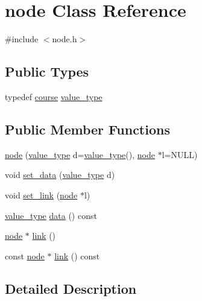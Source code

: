 \hypertarget{classnode}{}\section{node Class Reference}
\label{classnode}


{\ttfamily \#include $<$node.\+h$>$}

\subsection*{Public Types}
\begin{DoxyCompactItemize}
\item 
typedef \hyperlink{classcourse}{course} \hyperlink{classnode_af79958a8234d1a3d642adf6637cb9f9b}{value\+\_\+type}
\end{DoxyCompactItemize}
\subsection*{Public Member Functions}
\begin{DoxyCompactItemize}
\item 
\hyperlink{classnode_a4d89d50fbee6842a2588ef0c07063cb8}{node} (\hyperlink{classnode_af79958a8234d1a3d642adf6637cb9f9b}{value\+\_\+type} d=\hyperlink{classnode_af79958a8234d1a3d642adf6637cb9f9b}{value\+\_\+type}(), \hyperlink{classnode}{node} $\ast$l=N\+U\+LL)
\item 
void \hyperlink{classnode_ac9906af97ebcd35ffa46145f865eed6c}{set\+\_\+data} (\hyperlink{classnode_af79958a8234d1a3d642adf6637cb9f9b}{value\+\_\+type} d)
\item 
void \hyperlink{classnode_ae9887204ac73c954e3a4da3fa15c9df9}{set\+\_\+link} (\hyperlink{classnode}{node} $\ast$l)
\item 
\hyperlink{classnode_af79958a8234d1a3d642adf6637cb9f9b}{value\+\_\+type} \hyperlink{classnode_aa608d1caf66b840edfa523ee7825c995}{data} () const
\item 
\hyperlink{classnode}{node} $\ast$ \hyperlink{classnode_a3871737751cf0fd295a07c77d0c72f82}{link} ()
\item 
const \hyperlink{classnode}{node} $\ast$ \hyperlink{classnode_a1cdde999247cd38cf9dc9ee8fc91f5f7}{link} () const
\end{DoxyCompactItemize}


\subsection{Detailed Description}

